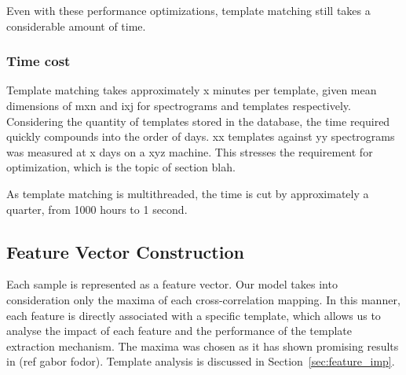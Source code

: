 Even with these performance optimizations, template matching still takes a
considerable amount of time.

\subsubsection{Time cost}
Template matching takes approximately x minutes per template, given
mean dimensions of mxn and ixj for spectrograms and templates respectively.
Considering the quantity of templates stored in the database, the time
required quickly compounds into the order of days.
xx templates against yy spectrograms was measured at x days on a xyz machine.
This stresses the requirement for optimization, which is the topic of
section blah.

As template matching is multithreaded, the time is cut by approximately a
quarter, from 1000 hours to 1 second.


\subsection{Feature Vector Construction}
Each sample is represented as a feature vector.
Our model takes into consideration only the maxima of each cross-correlation
mapping.
In this manner, each feature is directly associated with a specific template,
which allows us to analyse the impact of each feature and the performance of the
template extraction mechanism.
The maxima was chosen as it has shown promising results in (ref gabor fodor).
Template analysis is discussed in Section~\ref{sec:feature_imp}.

